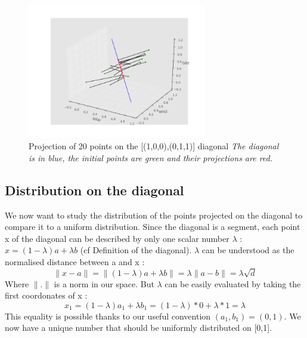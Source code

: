 \documentclass{article}
\begin{document}
	  \begin{figure}
  
    \includegraphics[width=0.7\textwidth]{proj3Ddiag2.png}
    \caption{Projection of 20 points on the [(1,0,0),(0,1,1)] diagonal \emph{The diagonal is in blue, the initial points are green and their projections are red.}}
\end{figure}


	\subsection{Distribution on the diagonal}
	We now want to study the distribution of the points projected on the diagonal to compare it to a uniform distribution. Since the diagonal is a segment, each point x of the diagonal can be described by only one scalar number $\lambda$ : $x = (1-\lambda)a+\lambda b $ (cf Definition of the diagonal). \newline
	$\lambda$ can be understood as the normalised distance between a and x :
	\begin{equation*}
		\| x-a \|	= \| (1-\lambda)a+\lambda b\|
					= \lambda \| a - b \|
					= \lambda \sqrt{d} 
	\end{equation*}
Where $\| . \|$ is a norm in our space.\newline
\newline
But $\lambda$ can be easily evaluated by taking the first coordonates of x : 
	\begin{equation*}
		x_1 = (1-\lambda)a_1 + \lambda b_1 = (1-\lambda) *0 + \lambda *1 = \lambda 
	\end{equation*}
This equality is possible thanks to our useful convention $(a_1,b_1)= (0,1)$.\newline
\newline
We now have a unique number that should be uniformly distributed on [0,1].
\end{document}

